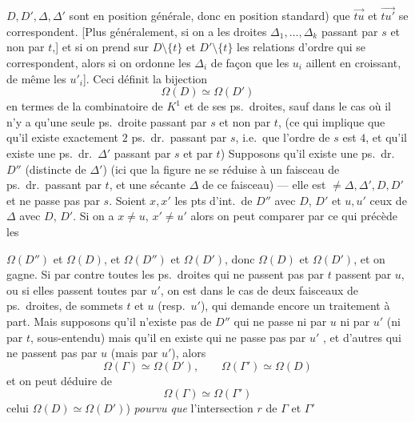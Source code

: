 \documentclass[11pt,a4paper]{article}
\begin{document}
$D, D', \Delta, \Delta'$ sont en position générale, donc en position standard) que $\overrightarrow{tu}$ et $\overrightarrow{tu'}$ se correspondent. [Plus généralement, si on a les droites $\Delta_1, \ldots, \Delta_k$ passant par $s$  et non par $t$,] et si on prend sur $D \setminus \lbrace t \rbrace$ et $D' \setminus \lbrace t \rbrace$ les relations d'ordre  qui se correspondent, alors si on ordonne les $\Delta_i$ de façon que les  $u_i$ aillent en croissant, de même les $u'_i$]. Ceci définit la bijection
\[
\Omega(D) \simeq \Omega(D')
\]
en termes de la combinatoire de $K^{1}$ et de ses ps.\ droites, sauf dans le cas où il n'y a qu'une seule ps.\ droite  passant par $s$ et non par $t$, (ce qui implique que qu'il existe exactement $2$ ps.\ dr.\ passant par $s$, i.e.\ que l'ordre de $s$ est $4$, et qu'il existe une ps.\ dr.\ $\Delta'$ passant par $s$ et par $t$) Supposons qu'il existe une ps.\ dr.\ $D''$  (distincte de $\Delta'$) \ill{} (ici que la figure ne se réduise à un faisceau de ps.\ dr.\ passant par $t$, et une sécante $\Delta$ de ce faisceau) --- elle est \ill{} $\neq \Delta, \Delta', D, D'$ et ne passe pas par $s$. Soient $x, x'$ les pts d'int.\ de $D''$ avec $D$, $D'$ et $u, u'$ ceux de $\Delta$ avec $D$, $D'$. Si on a $x \neq u$, $x' \neq u'$ alors on peut comparer par ce qui précède les \struck{\ill{}}

\struck{$\ill{}$} $\Omega(D'')$ \struck{\ill{}} et $\Omega(D)$, et $\Omega(D'')$ et $\Omega(D')$, donc $\Omega(D)$ et $\Omega(D')$, et on gagne. Si par contre toutes les ps.\ droites qui ne passent pas par $t$ passent par $u$, ou si elles passent toutes par $u'$, on est dans le cas de deux faisceaux de ps.\ droites, de sommets $t$ et $u$ (resp.\ $u'$), qui demande encore un traitement à part. Mais supposons qu'il n'existe pas de $D''$ qui ne passe ni par $u$ ni par $u'$ (ni par $t$, sous-entendu) mais qu'il en existe \add{$\Gamma$} qui ne passe pas par $u'$ , et d'autres  qui ne passent pas par $u$ (mais par $u'$), alors
\[
\Omega(\Gamma) \simeq \Omega(D') , \qquad \Omega(\Gamma') \simeq \Omega(D)
\]
et on peut déduire de
\[
\Omega(\Gamma) \simeq \Omega(\Gamma')
\]
celui $\Omega(D) \simeq \Omega(D')$) \emph{pourvu que} l'intersection $r$ de $\Gamma$ et $\Gamma'$
\end{document}
